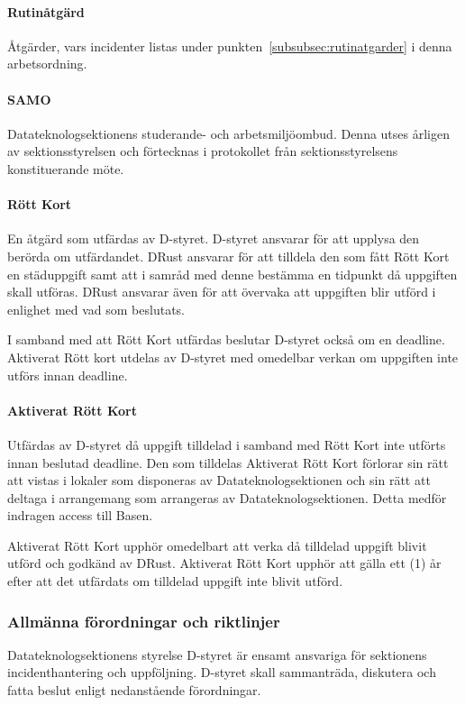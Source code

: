 \documentclass{dtek}
\begin{document}
\paragraph{Rutinåtgärd}
Åtgärder, vars incidenter listas under punkten~\ref{subsubsec:rutinatgarder} i
denna arbetsordning.

\paragraph{SAMO}
Datateknologsektionens studerande- och arbetsmiljöombud. Denna utses årligen av
sektionsstyrelsen och förtecknas i protokollet från sektionsstyrelsens
konstituerande möte.

\paragraph{Rött Kort}
En åtgärd som utfärdas av D-styret. D-styret ansvarar för att upplysa den
berörda om utfärdandet. DRust ansvarar för att tilldela den som fått Rött Kort
en städuppgift samt att i samråd med denne bestämma en tidpunkt då uppgiften
skall utföras. DRust ansvarar även för att övervaka att uppgiften blir utförd i
enlighet med vad som beslutats.

I samband med att Rött Kort utfärdas beslutar D-styret också om en deadline.
Aktiverat Rött kort utdelas av D-styret med omedelbar verkan om uppgiften inte
utförs innan deadline.

\paragraph{Aktiverat Rött Kort}
Utfärdas av D-styret då uppgift tilldelad i samband med Rött Kort inte utförts
innan beslutad deadline. Den som tilldelas Aktiverat Rött Kort förlorar sin
rätt att vistas i lokaler som disponeras av Datateknologsektionen och sin rätt
att deltaga i arrangemang som arrangeras av Datateknologsektionen. Detta medför
indragen access till Basen.

Aktiverat Rött Kort upphör omedelbart att verka då tilldelad uppgift blivit
utförd och godkänd av DRust. Aktiverat Rött Kort upphör att gälla ett (1) år
efter att det utfärdats om tilldelad uppgift inte blivit utförd.


\subsubsection{Allmänna förordningar och riktlinjer}
Datateknologsektionens styrelse D-styret är ensamt ansvariga för sektionens
incidenthantering och uppföljning. D-styret skall sammanträda, diskutera och
fatta beslut enligt nedanstående förordningar.
\end{document}
